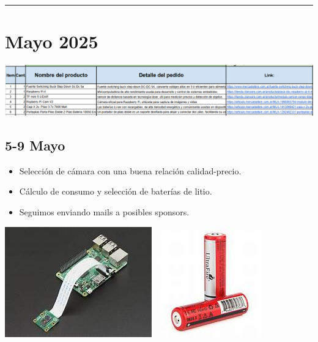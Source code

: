 \documentclass[12pt,a4paper]{article}
\newcommand{\separador}{\vspace{0.5cm}\noindent\rule{\linewidth}{0.5pt}\vspace{0.5cm}}
\begin{document}
\separador
\section*{Mayo 2025}



\includegraphics[width=\linewidth]{Carpeta de campo/Imagen6.png}

\subsection*{5-9 Mayo}

\begin{itemize}
    
\item Selección de cámara con una buena relación calidad-precio.
\item Cálculo de consumo y selección de baterías de litio.
\item Seguimos enviando mails a posibles sponsors.

\end{itemize}
\includegraphics[width=0.5\linewidth]{Carpeta de campo/Imagen7.png}
\includegraphics[width=0.5\linewidth]{Carpeta de campo/Imagen8.png}
\end{document}
